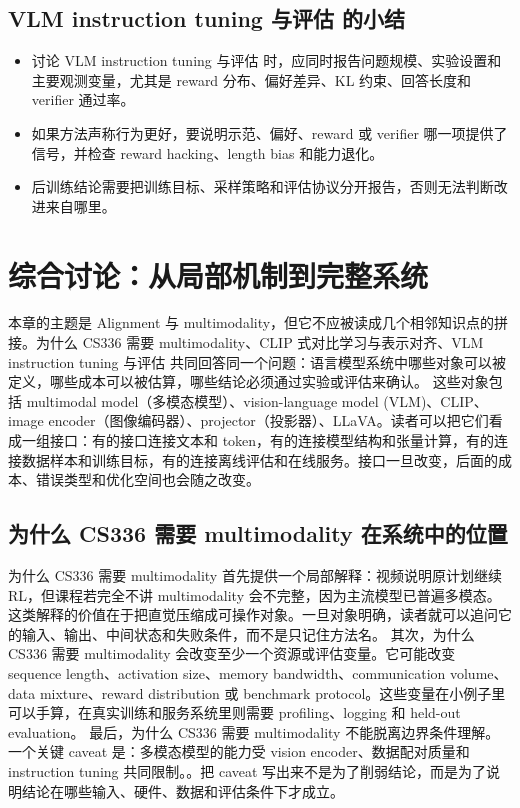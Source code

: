 \documentclass[a4paper]{article}
\begin{document}
\subsection{VLM instruction tuning 与评估 的小结}
\begin{itemize}
\item 讨论 VLM instruction tuning 与评估 时，应同时报告问题规模、实验设置和主要观测变量，尤其是 reward 分布、偏好差异、KL 约束、回答长度和 verifier 通过率。
\item 如果方法声称行为更好，要说明示范、偏好、reward 或 verifier 哪一项提供了信号，并检查 reward hacking、length bias 和能力退化。
\item 后训练结论需要把训练目标、采样策略和评估协议分开报告，否则无法判断改进来自哪里。
\end{itemize}
\section{综合讨论：从局部机制到完整系统}
本章的主题是 Alignment 与 multimodality，但它不应被读成几个相邻知识点的拼接。为什么 CS336 需要 multimodality、CLIP 式对比学习与表示对齐、VLM instruction tuning 与评估 共同回答同一个问题：语言模型系统中哪些对象可以被定义，哪些成本可以被估算，哪些结论必须通过实验或评估来确认。
这些对象包括 multimodal model（多模态模型）、vision-language model (VLM)、CLIP、image encoder（图像编码器）、projector（投影器）、LLaVA。读者可以把它们看成一组接口：有的接口连接文本和 token，有的连接模型结构和张量计算，有的连接数据样本和训练目标，有的连接离线评估和在线服务。接口一旦改变，后面的成本、错误类型和优化空间也会随之改变。
\subsection{为什么 CS336 需要 multimodality 在系统中的位置}
为什么 CS336 需要 multimodality 首先提供一个局部解释：视频说明原计划继续 RL，但课程若完全不讲 multimodality 会不完整，因为主流模型已普遍多模态。 这类解释的价值在于把直觉压缩成可操作对象。一旦对象明确，读者就可以追问它的输入、输出、中间状态和失败条件，而不是只记住方法名。
其次，为什么 CS336 需要 multimodality 会改变至少一个资源或评估变量。它可能改变 sequence length、activation size、memory bandwidth、communication volume、data mixture、reward distribution 或 benchmark protocol。这些变量在小例子里可以手算，在真实训练和服务系统里则需要 profiling、logging 和 held-out evaluation。
最后，为什么 CS336 需要 multimodality 不能脱离边界条件理解。一个关键 caveat 是：多模态模型的能力受 vision encoder、数据配对质量和 instruction tuning 共同限制。。把 caveat 写出来不是为了削弱结论，而是为了说明结论在哪些输入、硬件、数据和评估条件下才成立。
\end{document}
